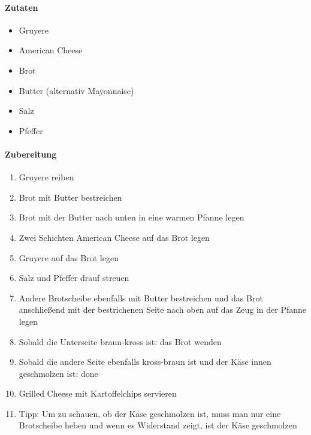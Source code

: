 \newpage
{}

\paragraph{Zutaten}
\begin{itemize}[noitemsep]
	\item Gruyere
	\item American Cheese
	\item Brot
	\item Butter (alternativ Mayonnaise)
	\item Salz
	\item Pfeffer
\end{itemize}


\paragraph{Zubereitung}
\begin{enumerate}[noitemsep]
	\item Gruyere reiben
	\item Brot mit Butter bestreichen
	\item Brot mit der Butter nach unten in eine warmen Pfanne legen
	\item Zwei Schichten American Cheese auf das Brot legen
	\item Gruyere auf das Brot legen
	\item Salz und Pfeffer drauf streuen
	\item Andere Brotscheibe ebenfalls mit Butter bestreichen und das Brot anschließend mit der bestrichenen Seite nach oben auf das Zeug in der Pfanne legen
	\item Sobald die Unterseite braun-kross ist: das Brot wenden
	\item Sobald die andere Seite ebenfalls kross-braun ist und der Käse innen geschmolzen ist: done
	\item Grilled Cheese mit Kartoffelchips servieren
	\item Tipp: Um zu schauen, ob der Käse geschmolzen ist, muss man nur eine Brotscheibe heben und wenn es Widerstand zeigt, ist der Käse geschmolzen
\end{enumerate}

